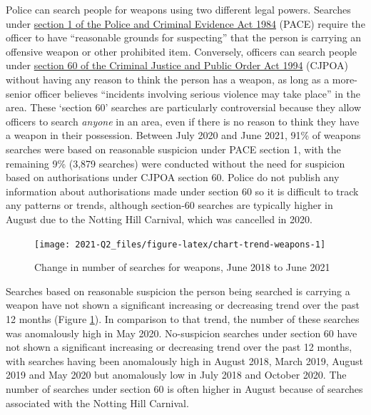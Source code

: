 \documentclass[
  a4paper,
  twoside, 11pt]{article}
\begin{document}
Police can search people for weapons using two different legal powers. Searches under \href{https://www.legislation.gov.uk/ukpga/1984/60/section/1}{section 1 of the Police and Criminal Evidence Act 1984} (PACE) require the officer to have ``reasonable grounds for suspecting'' that the person is carrying an offensive weapon or other prohibited item. Conversely, officers can search people under \href{https://www.legislation.gov.uk/ukpga/1994/33/section/60}{section 60 of the Criminal Justice and Public Order Act 1994} (CJPOA) without having any reason to think the person has a weapon, as long as a more-senior officer believes ``incidents involving serious violence may take place'' in the area. These `section 60' searches are particularly controversial because they allow officers to search \emph{anyone} in an area, even if there is no reason to think they have a weapon in their possession. Between July 2020 and June 2021, 91\% of weapons searches were based on reasonable suspicion under PACE section 1, with the remaining 9\% (3,879 searches) were conducted without the need for suspicion based on authorisations under CJPOA section 60. Police do not publish any information about authorisations made under section 60 so it is difficult to track any patterns or trends, although section-60 searches are typically higher in August due to the Notting Hill Carnival, which was cancelled in 2020.



\begin{figure}[tb]

{\centering \texttt{[image: 2021-Q2\_files/figure-latex/chart-trend-weapons-1]} 

}

\caption{Change in number of searches for weapons, June 2018 to June 2021}\label{fig:chart-trend-weapons}
\end{figure}

Searches based on reasonable suspicion the person being searched is carrying a weapon have not shown a significant increasing or decreasing trend over the past 12 months (Figure \ref{fig:chart-trend-weapons}). In comparison to that trend, the number of these searches was anomalously high in May 2020.
No-suspicion searches under section 60 have not shown a significant increasing or decreasing trend over the past 12 months, with searches having been anomalously high in August 2018, March 2019, August 2019 and May 2020 but anomalously low in July 2018 and October 2020. The number of searches under section 60 is often higher in August because of searches associated with the Notting Hill Carnival.
\end{document}
